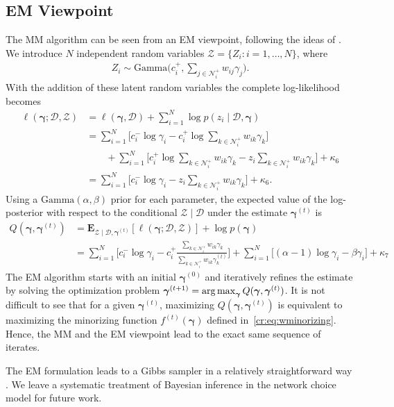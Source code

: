 \subsection{EM Viewpoint}

The MM algorithm can be seen from an EM viewpoint, following the ideas of \citet{caron2012efficient}.
We introduce $N$ independent random variables $\mathcal{Z} = \{ Z_i : i = 1, \ldots, N \}$, where
\begin{align*}
Z_i \sim \text{Gamma} \bigg( c^+_i, \sum_{j \in \mathcal{N}^+_i} w_{ij} \gamma_j \bigg).
\end{align*}
With the addition of these latent random variables the complete log-likelihood becomes
\begin{align*}
\ell(\bm{\gamma} ; \mathcal{D}, \mathcal{Z})
    &= \ell(\bm{\gamma}, \mathcal{D}) + \sum_{i = 1}^N \log p(z_i \mid \mathcal{D}, \bm{\gamma}) \\
    &= \sum_{i = 1}^N \bigg[ c^-_i \log \gamma_i - c^+_i \log \sum_{k \in \mathcal{N}^+_i} w_{ik} \gamma_k \bigg] \\
    &\qquad +\sum_{i = 1}^N \bigg[  c^+_i \log \sum_{k \in \mathcal{N}^+_i} w_{ik} \gamma_k - z_i \sum_{k \in \mathcal{N}^+_i} w_{ik} \gamma_k \bigg] + \kappa_6 \\
    &= \sum_{i = 1}^N \bigg[ c^-_i \log \gamma_i - z_i \sum_{k \in \mathcal{N}^+_i} w_{ik} \gamma_k \bigg] + \kappa_6.
\end{align*}
Using a $\text{Gamma}(\alpha, \beta)$ prior for each parameter, the expected value of the log-posterior with respect to the conditional $\mathcal{Z} \mid \mathcal{D}$ under the estimate $\bm{\gamma}^{(t)}$ is
\begin{align*}
Q(\bm{\gamma}, \bm{\gamma}^{(t)})
    &= \mathbf{E}_{\mathcal{Z} \mid \mathcal{D}, \bm{\gamma}^{(t)}} \left[ \ell(\bm{\gamma} ; \mathcal{D}, \mathcal{Z}) \right]
       + \log p(\bm{\gamma}) \\
    &=\sum_{i = 1}^N \bigg[ c^-_i \log \gamma_i - c^+_i \frac{\sum_{k \in \mathcal{N}^+_i} w_{ik} \gamma_k}{\sum_{k \in \mathcal{N}^+_i} w_{ik} \gamma^{(t)}_k} \bigg]
      + \sum_{i = 1}^N \bigg[ (\alpha -1) \log \gamma_i - \beta \gamma_i \bigg] + \kappa_7
\end{align*}
The EM algorithm starts with an initial $\bm{\gamma}^{(0)}$ and iteratively refines the estimate by solving the optimization problem $\bm{\gamma}^{(t+1)} = \operatorname*{arg\,max}_{\bm{\gamma}} Q(\bm{\gamma}, \bm{\gamma}^{(t)})$.
It is not difficult to see that for a given $\bm{\gamma}^{(t)}$, maximizing $Q(\bm{\gamma}, \bm{\gamma}^{(t)})$ is equivalent to maximizing the minorizing function $f^{(t)}(\bm{\gamma})$ defined in~\eqref{cr:eq:wminorizing}.
Hence, the MM and the EM viewpoint lead to the exact same sequence of iterates.

The EM formulation leads to a Gibbs sampler in a relatively straightforward way \citep{caron2012efficient}.
We leave a systematic treatment of Bayesian inference in the network choice model for future work.

